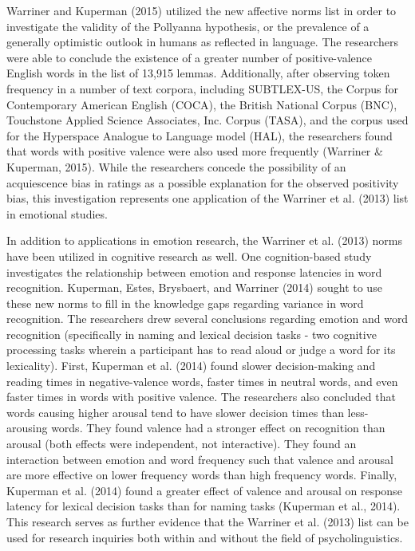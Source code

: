 \documentclass[english,,man]{apa6}
\begin{document}
Warriner and Kuperman (2015) utilized the new affective norms list in
order to investigate the validity of the Pollyanna hypothesis, or the
prevalence of a generally optimistic outlook in humans as reflected in
language. The researchers were able to conclude the existence of a
greater number of positive-valence English words in the list of 13,915
lemmas. Additionally, after observing token frequency in a number of
text corpora, including SUBTLEX-US, the Corpus for Contemporary American
English (COCA), the British National Corpus (BNC), Touchstone Applied
Science Associates, Inc. Corpus (TASA), and the corpus used for the
Hyperspace Analogue to Language model (HAL), the researchers found that
words with positive valence were also used more frequently (Warriner \&
Kuperman, 2015). While the researchers concede the possibility of an
acquiescence bias in ratings as a possible explanation for the observed
positivity bias, this investigation represents one application of the
Warriner et al. (2013) list in emotional studies.

In addition to applications in emotion research, the Warriner et al.
(2013) norms have been utilized in cognitive research as well. One
cognition-based study investigates the relationship between emotion and
response latencies in word recognition. Kuperman, Estes, Brysbaert, and
Warriner (2014) sought to use these new norms to fill in the knowledge
gaps regarding variance in word recognition. The researchers drew
several conclusions regarding emotion and word recognition (specifically
in naming and lexical decision tasks - two cognitive processing tasks
wherein a participant has to read aloud or judge a word for its
lexicality). First, Kuperman et al. (2014) found slower decision-making
and reading times in negative-valence words, faster times in neutral
words, and even faster times in words with positive valence. The
researchers also concluded that words causing higher arousal tend to
have slower decision times than less-arousing words. They found valence
had a stronger effect on recognition than arousal (both effects were
independent, not interactive). They found an interaction between emotion
and word frequency such that valence and arousal are more effective on
lower frequency words than high frequency words. Finally, Kuperman et
al. (2014) found a greater effect of valence and arousal on response
latency for lexical decision tasks than for naming tasks (Kuperman et
al., 2014). This research serves as further evidence that the Warriner
et al. (2013) list can be used for research inquiries both within and
without the field of psycholinguistics.
\end{document}

